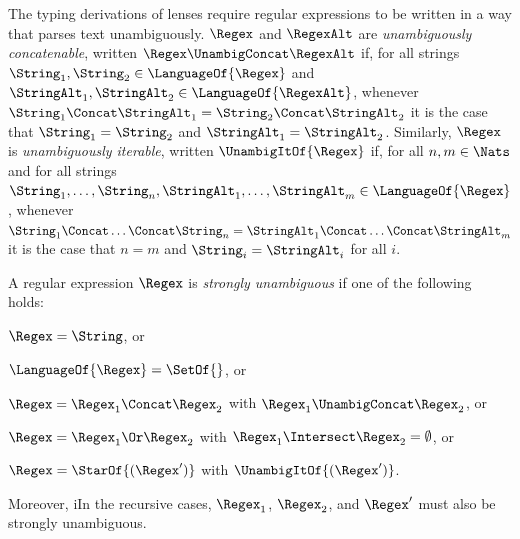 \documentclass[acmsmall,screen]{acmart}
\begin{document}

The typing derivations of lenses require regular expressions to be written in a
way that parses text unambiguously. $\Regex$ and $\RegexAlt$ are
\textit{unambiguously concatenable}, written
$\Regex\UnambigConcat\RegexAlt$ if, 
for all strings $\String_1,\String_2\in\LanguageOf{\Regex}$ and
$\StringAlt_1,\StringAlt_2\in\LanguageOf{\RegexAlt}$, whenever
$\String_1\Concat\StringAlt_1=\String_2\Concat\StringAlt_2$ it is the case that
$\String_1=\String_2$ and $\StringAlt_1=\StringAlt_2$.
%
Similarly, $\Regex$ is \textit{unambiguously iterable},
written $\UnambigItOf{\Regex}$ if,
for all $n,m\in\Nats$ and for all strings
$\String_1,\ldots,\String_n,\StringAlt_1,\ldots,\StringAlt_m\in\LanguageOf{\Regex}$,
whenever
$\String_1\Concat\ldots\Concat\String_n=\StringAlt_1\Concat\ldots\Concat\StringAlt_m$
it is the case that $n=m$ and $\String_i=\StringAlt_i$ for all $i$.

A regular expression $\Regex$ is \textit{strongly unambiguous} if one
of the following holds: 
\begin{enumerate*}[label=(\alph*) ]
\item $\Regex = \String$,  or
\item $\LanguageOf{\Regex} = \SetOf{}$, or 
\item $\Regex = \Regex_1 \Concat \Regex_2$ with $\Regex_1 \UnambigConcat
  \Regex_2$, or
\item $\Regex = \Regex_1 \Or \Regex_2$ with $\Regex_1 \Intersect \Regex_2 =
  \emptyset$, 
or
\item $\Regex = \StarOf{(\Regex')}$ with $\UnambigItOf{(\Regex')}$.
\end{enumerate*}
\iffull Moreover, i\else I\fi{}n the recursive cases, $\Regex_1$, $\Regex_2$, and $\Regex'$
must also be strongly unambiguous.
\end{document}
